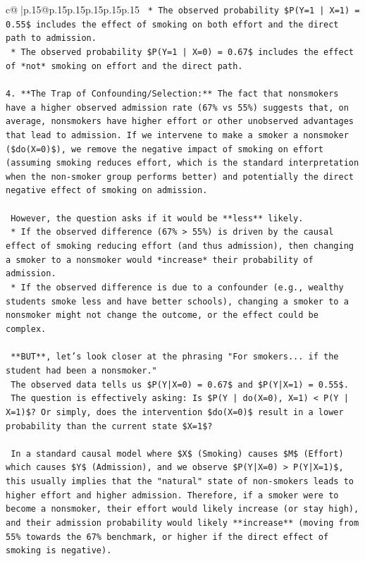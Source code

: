 \documentclass{article}
\begin{document}
{\begin{supertabular}{c@{$\;$}|p{.15\linewidth}@{}p{.15\linewidth}p{.15\linewidth}p{.15\linewidth}p{.15\linewidth}p{.15\linewidth}}
{{{\texttt{    *   The observed probability \$P(Y=1 | X=1) = 0.55\$ includes the effect of smoking on both effort and the direct path to admission.} \\
\texttt{    *   The observed probability \$P(Y=1 | X=0) = 0.67\$ includes the effect of *not* smoking on effort and the direct path.} \\
\\ 
\texttt{4.  **The Trap of Confounding/Selection:** The fact that nonsmokers have a higher observed admission rate (67\% vs 55\%) suggests that, on average, nonsmokers have higher effort or other unobserved advantages that lead to admission. If we intervene to make a smoker a nonsmoker (\$do(X=0)\$), we remove the negative impact of smoking on effort (assuming smoking reduces effort, which is the standard interpretation when the non{-}smoker group performs better) and potentially the direct negative effect of smoking on admission.} \\
\\ 
\texttt{    However, the question asks if it would be **less** likely.} \\
\texttt{    *   If the observed difference (67\% > 55\%) is driven by the causal effect of smoking reducing effort (and thus admission), then changing a smoker to a nonsmoker would *increase* their probability of admission.} \\
\texttt{    *   If the observed difference is due to a confounder (e.g., wealthy students smoke less and have better schools), changing a smoker to a nonsmoker might not change the outcome, or the effect could be complex.} \\
\\ 
\texttt{    **BUT**, let's look closer at the phrasing "For smokers... if the student had been a nonsmoker."} \\
\texttt{    The observed data tells us \$P(Y|X=0) = 0.67\$ and \$P(Y|X=1) = 0.55\$.} \\
\texttt{    The question is effectively asking: Is \$P(Y | do(X=0), X=1) < P(Y | X=1)\$? Or simply, does the intervention \$do(X=0)\$ result in a lower probability than the current state \$X=1\$?} \\
\\ 
\texttt{    In a standard causal model where \$X\$ (Smoking) causes \$M\$ (Effort) which causes \$Y\$ (Admission), and we observe \$P(Y|X=0) > P(Y|X=1)\$, this usually implies that the "natural" state of non{-}smokers leads to higher effort and higher admission. Therefore, if a smoker were to become a nonsmoker, their effort would likely increase (or stay high), and their admission probability would likely **increase** (moving from 55\% towards the 67\% benchmark, or higher if the direct effect of smoking is negative).} \\
}}}
\end{supertabular}}
\end{document}

